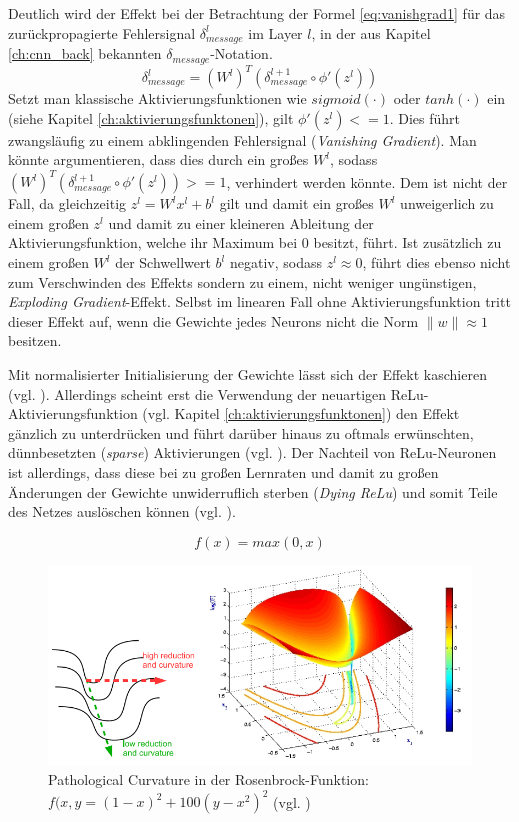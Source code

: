 Deutlich wird der Effekt bei der Betrachtung der Formel \ref{eq:vanishgrad1} für das zurück\-propagierte Fehlersignal $\delta_{message}^l$ im Layer $l$, in der aus Kapitel  \ref{ch:cnn_back} bekannten $\delta_{message}$-Notation.
\begin{equation}
\label{eq:vanishgrad1} 
\delta_{message}^{l} = (W^{l})^T (\delta_{message}^{l+1} \circ \phi'(z^l))
\end{equation}
Setzt man klassische Aktivierungsfunktionen wie $sigmoid(\cdot)$ oder $tanh(\cdot)$ ein (siehe Kapitel \ref{ch:aktivierungsfunktonen}), gilt $\phi'(z^l) <= 1 $. Dies führt zwangsläufig zu einem abklingenden Fehlersignal (\textit{Vanishing Gradient}). Man könnte argumentieren, dass dies durch ein großes $W^l$, sodass $ (W^{l})^T (\delta_{message}^{l+1} \circ \phi'(z^l)) >= 1$, verhindert werden könnte. Dem ist nicht der Fall, da gleichzeitig $z^l = W^lx^l + b^l$ gilt und damit ein großes $W^l$ unweigerlich zu einem großen $z^l$ und damit zu einer kleineren Ableitung der Aktivierungsfunktion, welche ihr Maximum bei $0$ besitzt, führt. Ist zusätzlich zu einem großen $W^l$ der Schwellwert $b^l$ negativ, sodass $z^l \approx 0$, führt dies ebenso nicht zum Verschwinden des Effekts sondern zu einem, nicht weniger ungünstigen, \textit{Exploding Gradient}-Effekt. Selbst im linearen Fall ohne Aktivierungsfunktion tritt dieser Effekt auf, wenn die Gewichte jedes Neurons nicht die Norm $\|w\| \approx 1 $ besitzen.
 
Mit normalisierter Initialisierung der Gewichte lässt sich der Effekt kaschieren (vgl. \cite{Glorot2010}). Allerdings scheint erst die Verwendung der neuartigen ReLu-Aktivierungsfunktion (vgl. Kapitel \ref{ch:aktivierungsfunktonen}) den Effekt gänzlich zu unterdrücken und führt darüber hinaus zu oftmals erwünschten, dünnbesetzten (\textit{sparse}) Aktivierungen (vgl. \cite{Glorot2011}). Der Nachteil von ReLu-Neuronen ist allerdings, dass diese bei zu großen Lernraten und damit zu großen Änderungen der Gewichte unwiderruflich sterben (\textit{Dying ReLu}) und somit Teile des Netzes auslöschen können (vgl. \cite{Maas2013}).   

\begin{equation} 
	f(x) =  max(0,x) 
\end{equation}


\begin{figure}
\centering
\includegraphics[width=0.7\linewidth]{images/4_pathological_curvature}
\caption[]{Pathological Curvature in der Rosenbrock-Funktion: $f(x,y = (1-x)^2 + 100(y -x^2)^2$ (vgl. \cite{Martens2010})}
\label{fig:4_pathological_curvature}
\end{figure}

